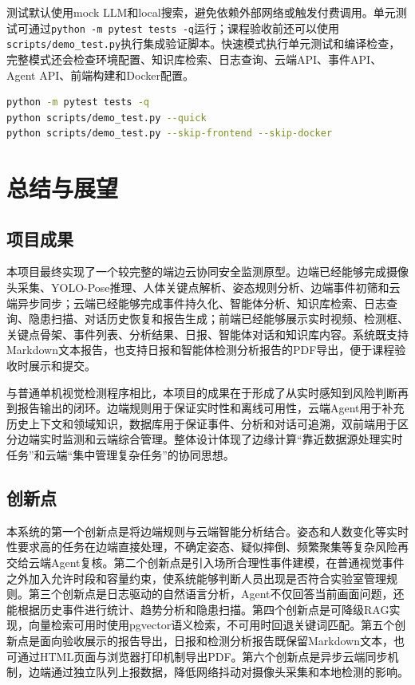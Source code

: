 测试默认使用mock LLM和local搜索，避免依赖外部网络或触发付费调用。单元测试可通过\verb|python -m pytest tests -q|运行；课程验收前还可以使用\verb|scripts/demo_test.py|执行集成验证脚本。快速模式执行单元测试和编译检查，完整模式还会检查环境配置、知识库检索、日志查询、云端API、事件API、Agent API、前端构建和Docker配置。

\begin{lstlisting}[language=bash]
python -m pytest tests -q
python scripts/demo_test.py --quick
python scripts/demo_test.py --skip-frontend --skip-docker
\end{lstlisting}

\section{总结与展望}

\subsection{项目成果}

本项目最终实现了一个较完整的端边云协同安全监测原型。边端已经能够完成摄像头采集、YOLO-Pose推理、人体关键点解析、姿态规则分析、边端事件初筛和云端异步同步；云端已经能够完成事件持久化、智能体分析、知识库检索、日志查询、隐患扫描、对话历史恢复和报告生成；前端已经能够展示实时视频、检测框、关键点骨架、事件列表、分析结果、日报、智能体对话和知识库内容。系统既支持Markdown文本报告，也支持日报和智能体检测分析报告的PDF导出，便于课程验收时展示和提交。

与普通单机视觉检测程序相比，本项目的成果在于形成了从实时感知到风险判断再到报告输出的闭环。边端规则用于保证实时性和离线可用性，云端Agent用于补充历史上下文和领域知识，数据库用于保证事件、分析和对话可追溯，双前端用于区分边端实时监测和云端综合管理。整体设计体现了边缘计算“靠近数据源处理实时任务”和云端“集中管理复杂任务”的协同思想。

\subsection{创新点}

本系统的第一个创新点是将边端规则与云端智能分析结合。姿态和人数变化等实时性要求高的任务在边端直接处理，不确定姿态、疑似摔倒、频繁聚集等复杂风险再交给云端Agent复核。第二个创新点是引入场所合理性事件建模，在普通视觉事件之外加入允许时段和容量约束，使系统能够判断人员出现是否符合实验室管理规则。第三个创新点是日志驱动的自然语言分析，Agent不仅回答当前画面问题，还能根据历史事件进行统计、趋势分析和隐患扫描。第四个创新点是可降级RAG实现，向量检索可用时使用pgvector语义检索，不可用时回退关键词匹配。第五个创新点是面向验收展示的报告导出，日报和检测分析报告既保留Markdown文本，也可通过HTML页面与浏览器打印机制导出PDF。第六个创新点是异步云端同步机制，边端通过独立队列上报数据，降低网络抖动对摄像头采集和本地检测的影响。

